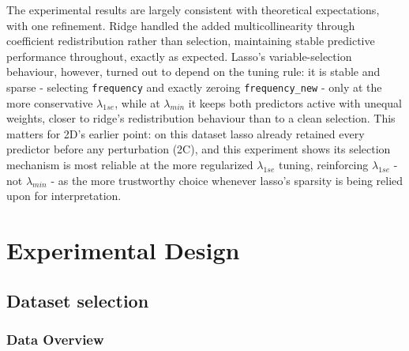 \documentclass[
  11pt,
]{article}
\begin{document}
The experimental results are largely consistent with theoretical
expectations, with one refinement. Ridge handled the added
multicollinearity through coefficient redistribution rather than
selection, maintaining stable predictive performance throughout, exactly
as expected. Lasso's variable-selection behaviour, however, turned out
to depend on the tuning rule: it is stable and sparse - selecting
\texttt{frequency} and exactly zeroing \texttt{frequency\_new} - only at
the more conservative \(\lambda_{1se}\), while at \(\lambda_{min}\) it
keeps both predictors active with unequal weights, closer to ridge's
redistribution behaviour than to a clean selection. This matters for
2D's earlier point: on this dataset lasso already retained every
predictor before any perturbation (2C), and this experiment shows its
selection mechanism is most reliable at the more regularized
\(\lambda_{1se}\) tuning, reinforcing \(\lambda_{1se}\) - not
\(\lambda_{min}\) - as the more trustworthy choice whenever lasso's
sparsity is being relied upon for interpretation.

\section{Experimental Design}\label{experimental-design}

\subsection{Dataset selection}\label{dataset-selection}

\subsubsection{Data Overview}\label{data-overview}
\end{document}
